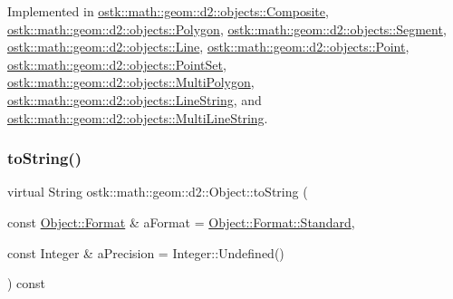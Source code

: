Implemented in \hyperlink{classostk_1_1math_1_1geom_1_1d2_1_1objects_1_1_composite_ae6e95f806b1cb5e026b484f5c3291d88}{ostk\+::math\+::geom\+::d2\+::objects\+::\+Composite}, \hyperlink{classostk_1_1math_1_1geom_1_1d2_1_1objects_1_1_polygon_adbf6ed9930a6dd2f3eab1c5c1b256ded}{ostk\+::math\+::geom\+::d2\+::objects\+::\+Polygon}, \hyperlink{classostk_1_1math_1_1geom_1_1d2_1_1objects_1_1_segment_a475ba5efb353218779018b9be88be276}{ostk\+::math\+::geom\+::d2\+::objects\+::\+Segment}, \hyperlink{classostk_1_1math_1_1geom_1_1d2_1_1objects_1_1_line_a8bd64cd001e4c05e3cdf7ebd7e520cb7}{ostk\+::math\+::geom\+::d2\+::objects\+::\+Line}, \hyperlink{classostk_1_1math_1_1geom_1_1d2_1_1objects_1_1_point_abcc3a265107dcccfcfe9349a6be788e5}{ostk\+::math\+::geom\+::d2\+::objects\+::\+Point}, \hyperlink{classostk_1_1math_1_1geom_1_1d2_1_1objects_1_1_point_set_aef3263b63b2e9c9667365f58faee9ac7}{ostk\+::math\+::geom\+::d2\+::objects\+::\+Point\+Set}, \hyperlink{classostk_1_1math_1_1geom_1_1d2_1_1objects_1_1_multi_polygon_ab7a22decd4f9409b08e1b0e6b2bd60ef}{ostk\+::math\+::geom\+::d2\+::objects\+::\+Multi\+Polygon}, \hyperlink{classostk_1_1math_1_1geom_1_1d2_1_1objects_1_1_line_string_afcdaa3f11f0bd830af0311392c7e9e26}{ostk\+::math\+::geom\+::d2\+::objects\+::\+Line\+String}, and \hyperlink{classostk_1_1math_1_1geom_1_1d2_1_1objects_1_1_multi_line_string_a5e90edd640ee9262194eb07d943bb8bb}{ostk\+::math\+::geom\+::d2\+::objects\+::\+Multi\+Line\+String}.

\mbox{\label{classostk_1_1math_1_1geom_1_1d2_1_1_object_ada4c2187dd24ef02b91b6346191f677c}} 
\subsubsection{\texorpdfstring{to\+String()}{toString()}}
{\footnotesize\ttfamily virtual String ostk\+::math\+::geom\+::d2\+::\+Object\+::to\+String (\begin{DoxyParamCaption}\item[{const \hyperlink{classostk_1_1math_1_1geom_1_1d2_1_1_object_aa76f9e30caebf4005bafbdff447f66cf}{Object\+::\+Format} \&}]{a\+Format = {\ttfamily \hyperlink{classostk_1_1math_1_1geom_1_1d2_1_1_object_aa76f9e30caebf4005bafbdff447f66cfaeb6d8ae6f20283755b339c0dc273988b}{Object\+::\+Format\+::\+Standard}},  }\item[{const Integer \&}]{a\+Precision = {\ttfamily Integer\+:\+:Undefined()} }\end{DoxyParamCaption}) const\hspace{0.3cm}{\ttfamily [pure virtual]}}



